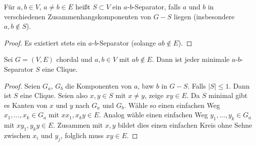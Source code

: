 \begin{df}
    Für $a, b \in V$, $a \neq b \in E$ heißt $S \subset V$ ein $a$-$b$-Separator, falls $a$ und $b$ in verschiedenen Zusammenhangskomponenten von $G - S$ liegen (insbesondere $a,b \not\in S$).
    \begin{proof}
        Es existiert stets ein $a$-$b$-Separator (solange $ab \not\in E$).
    \end{proof}
\end{df}

\begin{st}
    Sei $G = (V, E)$ chordal und $a, b \in V$ mit $ab \not\in E$.
    Dann ist jeder minimale $a$-$b$-Separator $S$ eine Clique.
    \begin{proof}
        Seien $G_a$, $G_b$ die Komponenten von $a$, bzw $b$ in $G - S$.
        Falls $|S| \le 1$.
        Dann ist $S$ eine Clique.
        Seien also $x, y \in S$ mit $x \neq y$, zeige $xy \in E$.
        Da $S$ minimal gibt es Kanten von $x$ und $y$ nach $G_a$ und $G_b$.
        Wähle so einen einfachen Weg $x_1, \dotsc, x_k \in G_a$ mit $xx_1, x_ky \in E$.
        Analog wähle einen einfachen Weg $y_1, \dotsc, y_k \in G_a$ mit $xy_1, y_ky \in E$.
        Zusammen mit $x,y$ bildet dies einen einfachen Kreis ohne Sehne zwischen $x_i$ und $y_j$, folglich muss $xy \in E$.
    \end{proof}
\end{st}




